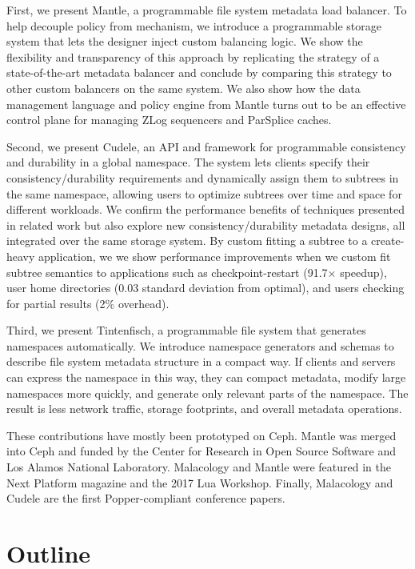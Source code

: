 First, we present Mantle, a programmable file system metadata load balancer.
To help decouple policy from mechanism, we introduce a programmable storage
system that lets the designer inject custom balancing logic. We show the
flexibility and transparency of this approach by replicating the strategy of a
state-of-the-art metadata balancer and conclude by comparing this strategy to
other custom balancers on the same system. We also show how the data management
language and policy engine from Mantle turns out to be an effective control
plane for managing ZLog sequencers and ParSplice caches.  

Second, we present Cudele, an API and framework for programmable consistency
and durability in a global namespace. The system lets clients specify their
consistency/durability requirements and dynamically assign them to subtrees in
the same namespace, allowing users to optimize subtrees over time and space for
different workloads. We confirm the performance benefits of techniques
presented in related work but also explore new consistency/durability metadata
designs, all integrated over the same storage system. By custom fitting a
subtree to a create-heavy application, we we show performance improvements when
we custom fit subtree semantics to applications such as checkpoint-restart
(91.7\(\times\) speedup), user home directories (0.03 standard deviation from
optimal), and users checking for partial results (2\% overhead).

Third, we present Tintenfisch, a programmable file system that generates
namespaces automatically. We introduce namespace generators and schemas to
describe file system metadata structure in a compact way. If clients and
servers can express the namespace in this way, they can compact metadata,
modify large namespaces more quickly, and generate only relevant parts of the
namespace. The result is less network traffic, storage footprints, and overall
metadata operations.

These contributions have mostly been prototyped on Ceph. Mantle was merged into
Ceph and funded by the Center for Research in Open Source Software and Los
Alamos National Laboratory. Malacology and Mantle were featured in the Next
Platform magazine and the 2017 Lua Workshop. Finally, Malacology and Cudele are
the first Popper-compliant conference papers.

\section{Outline}

